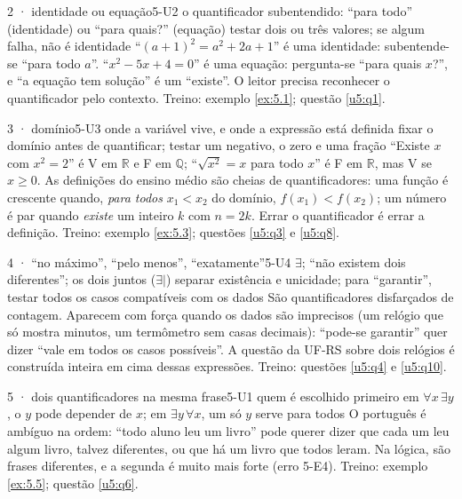 \begin{caso}{2 · identidade ou equação}{5-U2}
{o quantificador subentendido: \enquote{para todo} (identidade) ou \enquote{para quais?} (equação)}
{testar dois ou três valores; se algum falha, não é identidade}
\reconhecer \enquote{$(a+1)^2=a^2+2a+1$} é uma identidade: subentende-se \enquote{para todo $a$}. \enquote{$x^2-5x+4=0$} é uma equação: pergunta-se \enquote{para quais $x$?}, e \enquote{a equação tem solução} é um \enquote{existe}. O leitor precisa reconhecer o quantificador pelo contexto. Treino: exemplo \ref{ex:5.1}; questão \ref{u5:q1}.
\end{caso}

\begin{caso}{3 · domínio}{5-U3}
{onde a variável vive, e onde a expressão está definida}
{fixar o domínio antes de quantificar; testar um negativo, o zero e uma fração}
\reconhecer \enquote{Existe $x$ com $x^2=2$} é V em $\mathbb{R}$ e F em $\mathbb{Q}$; \enquote{$\sqrt{x^2}=x$ para todo $x$} é F em $\mathbb{R}$, mas V se $x\ge0$. As definições do ensino médio são cheias de quantificadores: uma função é crescente quando, \emph{para todos} $x_1<x_2$ do domínio, $f(x_1)<f(x_2)$; um número é par quando \emph{existe} um inteiro $k$ com $n=2k$. Errar o quantificador é errar a definição. Treino: exemplo \ref{ex:5.3}; questões \ref{u5:q3} e \ref{u5:q8}.
\end{caso}

\begin{caso}{4 · \enquote{no máximo}, \enquote{pelo menos}, \enquote{exatamente}}{5-U4}
{$\exists$; \enquote{não existem dois diferentes}; os dois juntos ($\exists|$)}
{separar existência e unicidade; para \enquote{garantir}, testar todos os casos compatíveis com os dados}
\reconhecer São quantificadores disfarçados de contagem. Aparecem com força quando os dados são imprecisos (um relógio que só mostra minutos, um termômetro sem casas decimais): \enquote{pode-se garantir} quer dizer \enquote{vale em todos os casos possíveis}. A questão da UF-RS sobre dois relógios é construída inteira em cima dessas expressões. Treino: questões \ref{u5:q4} e \ref{u5:q10}.
\end{caso}

\begin{caso}{5 · dois quantificadores na mesma frase}{5-U1}
{quem é escolhido primeiro}
{em $\forall x\,\exists y$, o $y$ pode depender de $x$; em $\exists y\,\forall x$, um só $y$ serve para todos}
\reconhecer O português é ambíguo na ordem: \enquote{todo aluno leu um livro} pode querer dizer que cada um leu algum livro, talvez diferentes, ou que há um livro que todos leram. Na lógica, são frases diferentes, e a segunda é muito mais forte (erro 5-E4). Treino: exemplo \ref{ex:5.5}; questão \ref{u5:q6}.
\end{caso}

